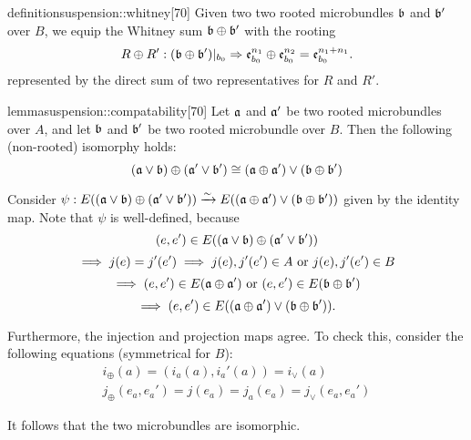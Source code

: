 \begin{mystatement}{definition}{suspension::whitney}[70]
    Given two two rooted microbundles $\bb$ and $\bb'$ over $B$,
    we equip the Whitney sum $\whitney{\bb}{\bb'}$ with the rooting
    \[ \germdef{\whitney{R}{R'}}{(\whitney{\bb}{\bb'})\restr{b_0}}{\whitney{\be[n_1]{b_0}}{\be[n_2]{b_0}} = \be[n_1 + n_1]{b_0}}. \]
    represented by the direct sum of two representatives for $R$ and $R'$.
\end{mystatement}

\begin{mystatement}{lemma}{suspension::compatability}[70]
    Let $\mathfrak{a}$ and $\mathfrak{a}'$ be two rooted microbundles over $A$,
    and let $\bb$ and $\bb'$ be two rooted microbundle over $B$.
    Then the following (non-rooted) isomorphy holds:
    \[ \whitney{(\ba \vee \bb)}{(\ba' \vee \bb')} \cong (\whitney{\ba}{\ba'}) \vee (\whitney{\bb}{\bb'}) \]
\end{mystatement}

\begin{myproof}
    Consider $\psi: E(\whitney{(\ba \vee \bb)}{(\ba' \vee \bb')}) \isomto E((\whitney{\ba}{\ba'}) \vee (\whitney{\bb}{\bb'}))$
    given by the identity map.
    Note that $\psi$ is well-defined, because
    \[ (e, e') \in E(\whitney{(\ba \vee \bb)}{(\ba' \vee \bb')}) \]
    \[ \implies j(e) = j'(e') \implies j(e), j'(e') \in A \text{ or } j(e), j'(e') \in B\]
    \[ \implies (e, e') \in E(\whitney{\ba}{\ba'}) \tor (e, e') \in E(\whitney{\bb}{\bb'}) \]
    \[ \implies (e, e') \in E((\whitney{\ba}{\ba'}) \vee (\whitney{\bb}{\bb'})). \]

    Furthermore, the injection and projection maps agree.
    To check this, consider the following equations (symmetrical for $B$):
    \begin{gather}
        i_\oplus(a) = (i_a(a), i_a'(a)) = i_\vee(a) \\
        j_\oplus(e_a, e_a') = j(e_a) = j_a(e_a) =  j_\vee(e_a, e_a')
    \end{gather}

    It follows that the two microbundles are isomorphic.
\end{myproof}